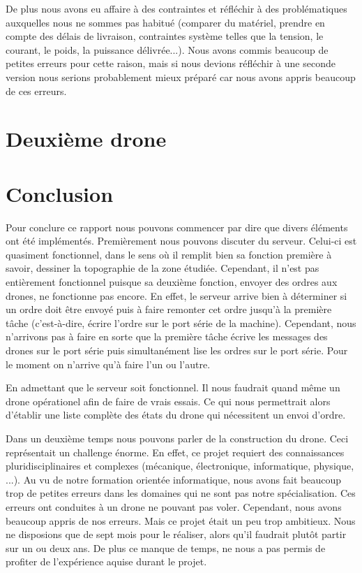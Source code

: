 \documentclass[a4paper,10pt]{report}
\begin{document}
      De plus nous avons eu affaire à des contraintes et réfléchir à des 
problématiques auxquelles nous ne sommes pas habitué (comparer du matériel, 
prendre en compte des délais de livraison, contraintes système telles que la 
tension, le courant, le poids, la puissance délivrée...). Nous avons commis 
beaucoup de petites erreurs pour cette raison, mais si nous devions réfléchir à 
une seconde version nous serions probablement mieux préparé car nous avons 
appris beaucoup de ces erreurs.
  
  \chapter{Deuxième drone}
  
  \chapter{Conclusion}
    Pour conclure ce rapport nous pouvons commencer par dire que divers 
éléments ont été implémentés. Premièrement nous pouvons discuter du serveur. 
Celui-ci est quasiment fonctionnel, dans le sens où il remplit bien sa fonction 
première à savoir, dessiner la topographie de la zone étudiée. Cependant, il 
n'est pas entièrement fonctionnel puisque sa deuxième fonction, envoyer des 
ordres aux drones, ne fonctionne pas encore. En effet, le serveur arrive bien à 
déterminer si un ordre doit être envoyé puis à faire remonter cet ordre jusqu'à 
la première tâche (c'est-à-dire, écrire l'ordre sur le port série de la 
machine). Cependant, nous n'arrivons pas à faire en sorte que la première tâche 
écrive les messages des drones sur le port série puis simultanément lise les 
ordres sur le port série. Pour le moment on n'arrive qu'à faire l'un ou l'autre.

    En admettant que le serveur soit fonctionnel. Il nous faudrait quand même 
un drone opérationel afin de faire de vrais essais. Ce qui nous permettrait 
alors d'établir une liste complète des états du drone qui nécessitent un envoi 
d'ordre.

    Dans un deuxième temps nous pouvons parler de la construction du drone. 
Ceci représentait un challenge énorme. En effet, ce projet requiert des 
connaissances pluridisciplinaires et complexes (mécanique, électronique, 
informatique, physique, ...). Au vu de notre formation orientée informatique, 
nous avons fait beaucoup trop de petites erreurs dans les domaines qui ne sont 
pas notre spécialisation. Ces erreurs ont conduites à un drone ne pouvant pas 
voler. Cependant, nous avons beaucoup appris de nos erreurs. Mais ce projet 
était un peu trop ambitieux. Nous ne disposions que de sept mois pour le 
réaliser, alors qu'il faudrait plutôt partir sur un ou deux ans. De plus ce 
manque de temps, ne nous a pas permis de profiter de l'expérience aquise durant 
le projet.
\end{document}
